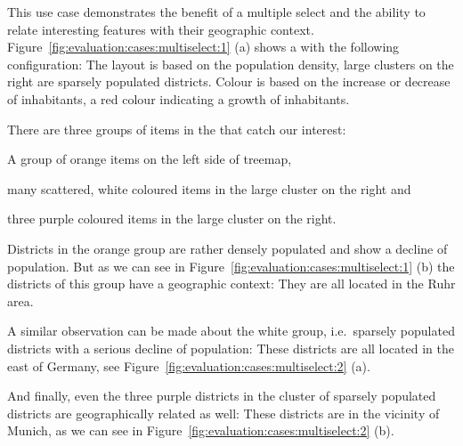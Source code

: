 This use case demonstrates the benefit of a multiple select and the ability to relate interesting features with their geographic context.
Figure~\ref{fig:evaluation:cases:multiselect:1} (a) shows a \tmap{} with the following configuration:
The layout is based on the population density, large clusters on the right are sparsely populated districts.
Colour is based on the increase or decrease of inhabitants, a red colour indicating a growth of inhabitants.

There are three groups of items in the \tmap{} that catch our interest:
\begin{enumerate*}[label=(\arabic*)]
  \item A group of orange items on the left side of treemap,
  \item many scattered, white coloured items in the large cluster on the right and
  \item three purple coloured items in the large cluster on the right.
\end{enumerate*}

Districts in the orange group are rather densely populated and show a decline of population.
But as we can see in Figure~\ref{fig:evaluation:cases:multiselect:1} (b) the districts of this group have a geographic context:
They are all located in the Ruhr area.

A similar observation can be made about the white group, i.e.\ sparsely populated districts with a serious decline of population:
These districts are all located in the east of Germany, see Figure~\ref{fig:evaluation:cases:multiselect:2} (a).

And finally, even the three purple districts in the cluster of sparsely populated districts are geographically related as well:
These districts are in the vicinity of Munich, as we can see in Figure~\ref{fig:evaluation:cases:multiselect:2} (b).


